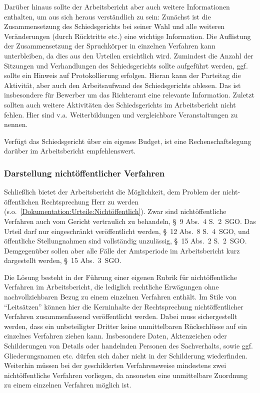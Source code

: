 Darüber hinaus sollte der Arbeitsbericht aber auch weitere Informationen enthalten, um aus sich heraus verständlich zu sein:
Zunächst ist die Zusammensetzung des Schiedsgerichts bei seiner Wahl und alle weiteren Veränderungen (durch Rücktritte etc.) eine wichtige Information.
Die Auflistung der Zusammensetzung der Spruchkörper in einzelnen Verfahren kann unterbleiben, da dies aus den Urteilen ersichtlich wird.
Zumindest die Anzahl der Sitzungen und Verhandlungen des Schiedsgerichts sollte aufgeführt werden, ggf. sollte ein Hinweis auf Protokollierung erfolgen.
Hieran kann der Parteitag die Aktivität, aber auch den Arbeitsaufwand des Schiedsgerichts ablesen.
Das ist insbesondere für Bewerber um das Richteramt eine relevante Information.
Zuletzt sollten auch weitere Aktivitäten des Schiedsgerichts im Arbeitsbericht nicht fehlen.
Hier sind v.a. Weiterbildungen und vergleichbare Veranstaltungen zu nennen.

Verfügt das Schiedsgericht über ein eigenes Budget, ist eine Rechenschaftslegung darüber im Arbeitsbericht empfehlenswert.

\subsubsection{Darstellung nichtöffentlicher Verfahren}
\label{Dokumentation:Rechenschaftslegung:Arbeitsbericht:nichtöffentlicheVerfahren}
Schließlich bietet der Arbeitsbericht die Möglichkeit, dem Problem der nicht-öffentlichen Rechtsprechung Herr zu werden (s.o.~\ref{Dokumentation:Urteile:Nichtöffentlich}).
Zwar sind nichtöffentliche Verfahren auch vom Gericht vertraulich zu behandeln, \S~9 Abs.~4 S.~2~SGO.
Das Urteil darf nur eingeschränkt veröffentlicht werden, \S~12 Abs.~8 S.~4~SGO, und öffentliche Stellungnahmen sind vollständig unzulässig, \S~15 Abs.~2 S.~2~SGO.
Demgegenüber sollen aber alle Fälle der Amtsperiode im Arbeitsbericht kurz dargestellt werden, \S~15 Abs.~3~SGO.

Die Lösung besteht in der Führung einer eigenen Rubrik für nichtöffentliche Verfahren im Arbeitsbericht, die lediglich rechtliche Erwägungen ohne nachvollziehbaren Bezug zu einem einzelnen Verfahren enthält.
Im Stile von \enquote{Leitsätzen} können hier die Kerninhalte der Rechtsprechung nichtöffentlicher Verfahren zusammenfassend veröffentlicht werden.
Dabei muss sichergestellt werden, dass ein unbeteiligter Dritter keine unmittelbaren Rückschlüsse auf ein einzelnes Verfahren ziehen kann.
Insbesondere Daten, Aktenzeichen oder Schilderungen von Details oder handelnden Personen des Sachverhalts, sowie ggf. Gliederungsnamen etc. dürfen sich daher nicht in der Schilderung wiederfinden.
Weiterhin müssen bei der geschilderten Verfahrensweise mindestens zwei nichtöffentliche Verfahren vorliegen, da ansonsten eine unmittelbare Zuordnung zu einem einzelnen Verfahren möglich ist.

